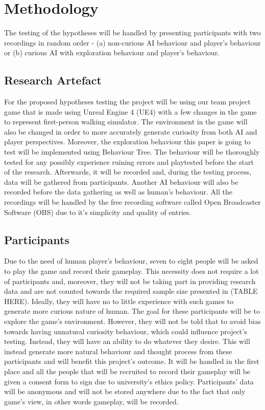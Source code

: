 \documentclass[journal]{IEEEtran}
\begin{document}
\section{Methodology}
The testing of the hypotheses will be handled by presenting participants with two recordings in random order - (a) non-curious AI behaviour and player's behaviour or (b) curious AI with exploration behaviour and player's behaviour.

\subsection{Research Artefact}
For the proposed hypotheses testing the project will be using our team project game that is made using Unreal Engine 4 (UE4) with a few changes in the game to represent first-person walking simulator. The environment in the game will also be changed in order to more accurately generate curiosity from both AI and player perspectives. Moreover, the exploration behaviour this paper is going to test will be implemented using Behaviour Tree. The behaviour will be thoroughly tested for any possibly experience ruining errors and playtested before the start of the research. Afterwards, it will be recorded and, during the testing process, data will be gathered from participants. Another AI behaviour will also be recorded before the data gathering as well as human's behaviour. All the recordings will be handled by the free recording software called Open Broadcaster Software (OBS) due to it's simplicity and quality of entries.

\subsection{Participants}
Due to the need of human player's behaviour, seven to eight people will be asked to play the game and record their gameplay. This necessity does not require a lot of participants and, moreover, they will not be taking part in providing research data and are not counted towards the required sample size presented in (TABLE HERE). Ideally, they will have no to little experience with such games to generate more curious nature of human. The goal for these participants will be to explore the game's environment. However, they will not be told that to avoid bias towards having unnatural curiosity behaviour, which could influence project's testing. Instead, they will have an ability to do whatever they desire. This will instead generate more natural behaviour and thought process from these participants and will benefit this project's outcome. It will be handled in the first place and all the people that will be recruited to record their gameplay will be given a consent form to sign due to university's ethics policy. Participants' data will be anonymous and will not be stored anywhere due to the fact that only game's view, in other words gameplay, will be recorded.
\end{document}
